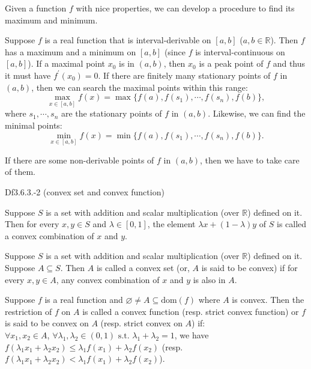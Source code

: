 \documentclass{article}
\begin{document}
\begin{Rmk}{}
    Given a function $f$ with nice properties, we can develop a procedure to find its maximum and minimum.

    Suppose $f$ is a real function that is interval-derivable on $[a,b]$ ($a,b\in\mathbb{R}$). Then $f$ has a maximum and a minimum on $[a,b]$ (since $f$ is interval-continuous on $[a,b]$). If a maximal point $x_0$ is in $(a,b)$, then $x_0$ is a peak point of $f$ and thus it must have $f^\prime(x_0) = 0$. If there are finitely many stationary points of $f$ in $(a,b)$, then we can search the maximal points within this range:
    $$ \max_{x\in [a,b]} f(x) = \max\{f(a), f(s_1), \cdots, f(s_n), f(b)\}, $$
    where $s_1, \cdots, s_n$ are the stationary points of $f$ in $(a,b)$. Likewise, we can find the minimal points:
    $$ \min_{x\in [a,b]} f(x) = \min\{f(a), f(s_1), \cdots, f(s_n), f(b)\}. $$

    If there are some non-derivable points of $f$ in $(a,b)$, then we have to take care of them. 
\end{Rmk}

\begin{Df}{Df3.6.3.-2 (convex set and convex function)}
    \begin{compactenum}
        \item Suppose $S$ is a set with addition and scalar multiplication (over $\mathbb{R}$) defined on it. Then for every $x, y\in S$ and $\lambda\in [0,1]$, the element $\lambda x + (1-\lambda)y$ of $S$ is called a convex combination of $x$ and $y$. 
        \item Suppose $S$ is a set with addition and scalar multiplication (over $\mathbb{R}$) defined on it. Suppose $A\subseteq S$. Then $A$ is called a convex set (or, $A$ is said to be convex) if for every $x, y\in A$, any convex combination of $x$ and $y$ is also in $A$.
        \item Suppose $f$ is a real function and $\varnothing\neq A\subseteq\text{dom}(f)$ where $A$ is convex. Then the restriction of $f$ on $A$ is called a convex function (resp. strict convex function) or $f$ is said to be convex on $A$ (resp. strict convex on $A$) if: \\
        $\forall x_1, x_2\in A$, $\forall \lambda_1, \lambda_2\in (0,1) \text{ s.t. } \lambda_1+\lambda_2=1$, we have $f(\lambda_1 x_1 + \lambda_2 x_2) \leq \lambda_1 f(x_1) + \lambda_2 f(x_2)$ (resp. $f(\lambda_1 x_1 + \lambda_2 x_2) < \lambda_1 f(x_1) + \lambda_2 f(x_2)$).
    \end{compactenum}
\end{Df}
\end{document}
